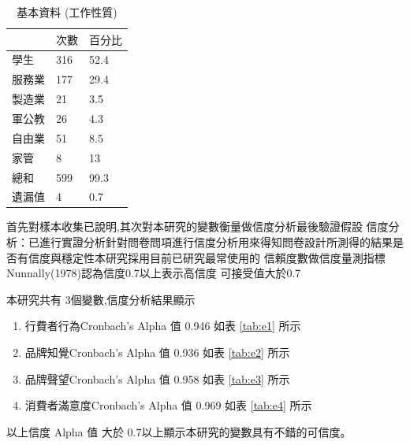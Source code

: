 \begin{table}[htb]
\caption{基本資料 (工作性質)}
\label{tab:PL4}
\renewcommand{\arraystretch}{1.2} %
\arrayrulewidth=1pt               %
\tabcolsep=18pt                   %
\begin{tabular}[t]{lll}  %
\hline
 & $次數$ & $百分比$ \\
\hline
學生           & 316  & 52.4 \\
服務業        & 177  & 29.4 \\
製造業        & 21  & 3.5 \\
軍公教        & 26  &4.3\\
自由業        & 51  & 8.5 \\
家管           & 8  & 13 \\
總和               & 599  & 99.3 \\
遺漏值            & 4 & 0.7 \\
\hline
\end{tabular}
\end{table}

首先對樣本收集已說明,其次對本研究的變數衡量做信度分析最後驗證假設
信度分析：已進行實證分析針對問卷問項進行信度分析用來得知問卷設計所測得的結果是否有信度與穩定性本研究採用目前已研究最常使用的 信賴度數做信度量測指標 Nunnally(1978)認為信度0.7以上表示高信度 可接受值大於0.7

本研究共有 3個變數,信度分析結果顯示
\begin{enumerate}
\item 行費者行為Cronbach's Alpha 值 0.946  如表 \ref{tab:e1}  所示
\item 品牌知覺Cronbach's Alpha 值 0.936  如表 \ref{tab:e2}  所示
\item 品牌聲望Cronbach's Alpha 值  0.958 如表 \ref{tab:e3}  所示
\item 消費者滿意度Cronbach's Alpha 值 0.969 如表 \ref{tab:e4}  所示
\end{enumerate}
以上信度 Alpha 值 大於 0.7以上顯示本研究的變數具有不錯的可信度。

